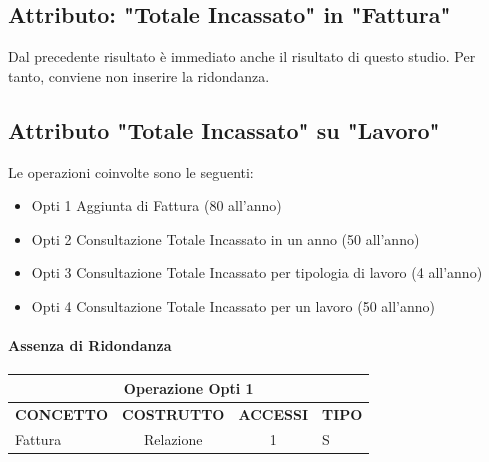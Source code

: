 \documentclass{elegantbook}
\begin{document}
        \subsection{Attributo: "Totale Incassato" in "Fattura"}
        Dal precedente risultato è immediato anche il risultato di questo studio. Per tanto,
        conviene non inserire la ridondanza.

        \subsection{Attributo "Totale Incassato" su "Lavoro"}
        Le operazioni coinvolte sono le seguenti:
        \begin{itemize}
            \item  Opti 1 Aggiunta di Fattura (80 all'anno)
            \item  Opti 2 Consultazione Totale Incassato in un anno (50 all'anno)
            \item  Opti 3 Consultazione Totale Incassato per tipologia di lavoro (4 all'anno)
            \item  Opti 4 Consultazione Totale Incassato per un lavoro (50 all'anno)
        \end{itemize}
        \newcommand\optiOne{80}
        \newcommand\optiTwo{50}
        \newcommand\optiThree{4}
        \newcommand\optiFour{50}
        \newcommand\lavoriMediMensili{\the\numexpr (\volumeLavoro/120) \relax}
        \newcommand\lavoriMediMensiliAnno{\the\numexpr (\lavoriMediMensili*13)/2 \relax}
        \newcommand\fattureMedieMensiliAnno{\the\numexpr (\fattureMedieMensili*13)/2 \relax }

        \paragraph{Assenza di Ridondanza}

        \begin{table}[H]
            \begin{tabular}{|p{5cm}|c|c|p{5cm}|}
            \hline
            \multicolumn{4}{|c|}{Operazione Opti 1}\\ 
            \hline
            \textbf{CONCETTO} & \textbf{COSTRUTTO} & \textbf{ACCESSI} & \textbf{TIPO} \\
            \hline
            Fattura & Relazione & 1 & S \\
            \hline
            \end{tabular}
        \end{table}
\end{document}
